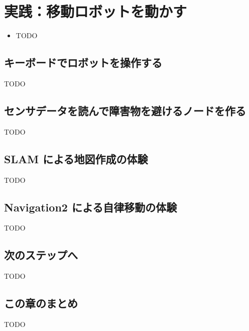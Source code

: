 \chapter{実践：移動ロボットを動かす}
\label{chap:practice}

\begin{goalbox}
  \begin{itemize}
    \item TODO
  \end{itemize}
\end{goalbox}

\section{キーボードでロボットを操作する}

TODO

\section{センサデータを読んで障害物を避けるノードを作る}

TODO

\section{SLAM による地図作成の体験}

TODO

\section{Navigation2 による自律移動の体験}

TODO

\section{次のステップへ}

TODO

\section*{この章のまとめ}

TODO
